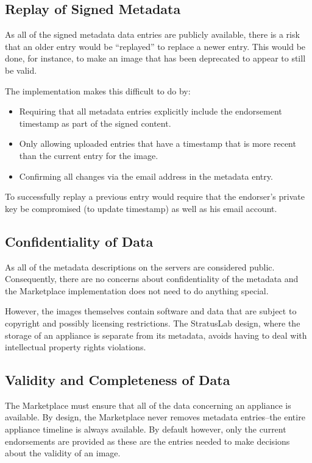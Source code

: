 \subsection{Replay of Signed Metadata}

As all of the signed metadata data entries are publicly available,
there is a risk that an older entry would be ``replayed'' to replace a
newer entry.  This would be done, for instance, to make an image that
has been deprecated to appear to still be valid.

The implementation makes this difficult to do by:
\begin{itemize}
\item Requiring that all metadata entries explicitly include the
  endorsement timestamp as part of the signed content.
\item Only allowing uploaded entries that have a timestamp that is 
  more recent than the current entry for the image.
\item Confirming all changes via the email address in the metadata
  entry.
\end{itemize}
To successfully replay a previous entry would require that the
endorser's private key be compromised (to update timestamp) as well as
his email account.

\subsection{Confidentiality of Data}

As all of the metadata descriptions on the servers are considered
public.  Consequently, there are no concerns about confidentiality of
the metadata and the Marketplace implementation does not need to do
anything special.

However, the images themselves contain software and data that are
subject to copyright and possibly licensing restrictions.  The
StratusLab design, where the storage of an appliance is separate from
its metadata, avoids having to deal with intellectual property rights
violations.

\subsection{Validity and Completeness of Data}

The Marketplace must ensure that all of the data concerning an
appliance is available.  By design, the Marketplace never removes
metadata entries--the entire appliance timeline is always available.
By default however, only the current endorsements are provided as
these are the entries needed to make decisions about the validity of
an image.  

